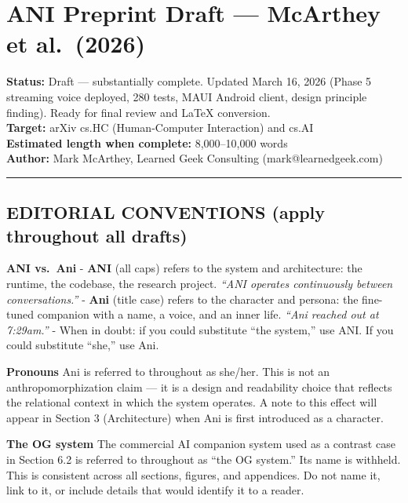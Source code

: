 \section{ANI Preprint Draft --- McArthey et
al.~(2026)}\label{ani-preprint-draft-mcarthey-et-al.-2026}

\textbf{Status:} Draft --- substantially complete. Updated March 16,
2026 (Phase 5 streaming voice deployed, 280 tests, MAUI Android client,
design principle finding). Ready for final review and LaTeX
conversion.\\
\textbf{Target:} arXiv cs.HC (Human-Computer Interaction) and cs.AI\\
\textbf{Estimated length when complete:} 8,000--10,000 words\\
\textbf{Author:} Mark McArthey, Learned Geek Consulting
(mark@learnedgeek.com)

\begin{center}\rule{0.5\linewidth}{0.5pt}\end{center}

\subsection{EDITORIAL CONVENTIONS (apply throughout all
drafts)}\label{editorial-conventions-apply-throughout-all-drafts}

\textbf{ANI vs.~Ani} - \textbf{ANI} (all caps) refers to the system and
architecture: the runtime, the codebase, the research project.
\emph{``ANI operates continuously between conversations.''} -
\textbf{Ani} (title case) refers to the character and persona: the
fine-tuned companion with a name, a voice, and an inner life.
\emph{``Ani reached out at 7:29am.''} - When in doubt: if you could
substitute ``the system,'' use ANI. If you could substitute ``she,'' use
Ani.

\textbf{Pronouns} Ani is referred to throughout as she/her. This is not
an anthropomorphization claim --- it is a design and readability choice
that reflects the relational context in which the system operates. A
note to this effect will appear in Section 3 (Architecture) when Ani is
first introduced as a character.

\textbf{The OG system} The commercial AI companion system used as a
contrast case in Section 6.2 is referred to throughout as ``the OG
system.'' Its name is withheld. This is consistent across all sections,
figures, and appendices. Do not name it, link to it, or include details
that would identify it to a reader.

